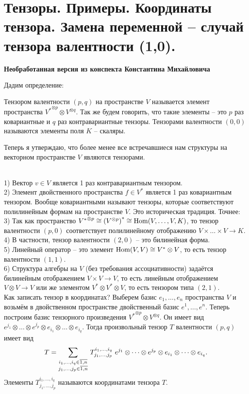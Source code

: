 \section{
 Тензоры. Примеры. Координаты тензора. Замена переменной – случай тензора валентности (1,0). %
}

\textbf{Необработанная версия из конспекта Константина Михайловича}

Дадим определение:

\dfn Тензором валентности $(p,q)$ на пространстве $V$ называется элемент пространства ${V^{*}}^{\otimes p} \otimes V^{\otimes q}$. Так же будем говорить, что такие элементы -- это $p$ раз ковариантные и $q$ раз контравариантные тензоры. Тензорами валентности $(0,0)$ называются элементы поля $K$ -- скаляры.
\edfn

Теперь я утверждаю, что более менее все встречавшиеся нам структуры на векторном пространстве $V$ являются тензорами.



\exm\\
1) Вектор $v\in V$ является 1 раз контравариантным тензором.\\
2) Элемент двойственного пространства $f \in V^{*}$ является 1 раз ковариантным тензором. Вообще ковариантными называют тензоры, которые соответствуют полилинейным формам на пространстве $V$. Это историческая традиция. Точнее:\\
3) Так как пространство ${V^{*}}^{\otimes p} \cong \left(V^{\otimes p}\right)^*\cong \operatorname{Hom}(V,\dots,V,K)$, то тензор валентности $(p,0)$ соответствует полилинейному отображению $V\times\dots \times V \to K$.\\
4) В частности, тензор валентности $(2,0)$ -- это билинейная форма.\\
5) Линейный оператор -- это элемент $\operatorname{Hom}(V,V)\cong V^{*}\otimes V$, то есть тензор валентности $(1,1)$.\\
6) Структура алгебры на $V$ (без требования ассоциативности) задаётся билинейным отображением $V \times V \to V$, то есть линейным отображением $V\otimes V \to V$ или же элементом $V^{*}\otimes V^* \otimes V$, то есть тензором типа $(2,1)$.\\

Как записать тензор в координатах? Выберем базис $e_1,\dots,e_n$ пространства $V$ и возьмём в двойственном пространстве двойственный базис $e^1,\dots,e^n$. Теперь построим базис тензорного произведения ${V^{*}}^{\otimes p}\otimes V^{\otimes q}$. Он имеет вид $e^{j_1}\otimes\dots\otimes e^{j_p}\otimes e_{i_1}\otimes \dots \otimes e_{i_q}$. Тогда произвольный тензор $T$ валентности $(p,q)$ имеет вид 
$$ T= \sum_{\substack{i_1,\dots,i_q \in \overline{1,n}\\ j_1,\dots,j_p \in \overline{1,n}} } \,T_{j_1,\dots,j_p}^{i_1,\dots,i_q}\,\, e^{j_1}\otimes\dots\otimes e^{j_p}\otimes e_{i_1}\otimes \dots \otimes e_{i_q}.$$
Элементы $T_{j_1,\dots,j_p}^{i_1,\dots,i_q}$ называются координатами тензора $T$.


